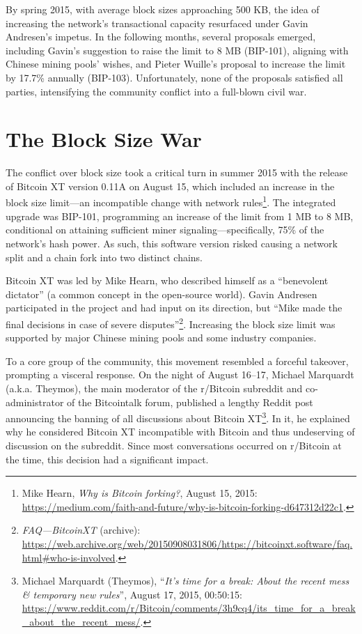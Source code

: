 \documentclass[
  a5paper,
  smalldemyvopaper,10pt,twoside,onecolumn,openright,extrafontsizes,hidelinks]{memoir}
\begin{document}
By spring 2015, with average block sizes approaching 500 KB, the idea of
increasing the network's transactional capacity resurfaced under Gavin
Andresen's impetus. In the following months, several proposals emerged,
including Gavin's suggestion to raise the limit to 8 MB (BIP-101),
aligning with Chinese mining pools' wishes, and Pieter Wuille's proposal
to increase the limit by 17.7\% annually (BIP-103). Unfortunately, none
of the proposals satisfied all parties, intensifying the community
conflict into a full-blown civil war.

\section*{The Block Size War}\label{la-guerre-des-blocs}


The conflict over block size took a critical turn in summer 2015 with
the release of Bitcoin XT version 0.11A on August 15, which included an
increase in the block size limit---an incompatible change with network
rules\footnote{Mike Hearn, \emph{Why is Bitcoin forking?}, August 15,
  2015:
  \url{https://medium.com/faith-and-future/why-is-bitcoin-forking-d647312d22c1}.}.
The integrated upgrade was BIP-101, programming an increase of the limit
from 1 MB to 8 MB, conditional on attaining sufficient miner
signaling---specifically, 75\% of the network's hash power. As such,
this software version risked causing a network split and a chain fork
into two distinct chains.

Bitcoin XT was led by Mike Hearn, who described himself as a
``benevolent dictator'' (a common concept in the open-source world).
Gavin Andresen participated in the project and had input on its
direction, but ``Mike made the final decisions in case of severe
disputes''\footnote{\emph{FAQ---BitcoinXT} (archive):
  \url{https://web.archive.org/web/20150908031806/https://bitcoinxt.software/faq.html\#who-is-involved}.}.
Increasing the block size limit was supported by major Chinese mining
pools and some industry companies.

To a core group of the community, this movement resembled a forceful
takeover, prompting a visceral response. On the night of August 16--17,
Michael Marquardt (a.k.a. Theymos), the main moderator of the r/Bitcoin
subreddit and co-administrator of the Bitcointalk forum, published a
lengthy Reddit post announcing the banning of all discussions about
Bitcoin XT\footnote{Michael Marquardt (Theymos), ``\emph{It's time for a
  break: About the recent mess \& temporary new rules}'', August 17,
  2015, 00:50:15:
  \url{https://www.reddit.com/r/Bitcoin/comments/3h9cq4/its_time_for_a_break_about_the_recent_mess/}.}.
In it, he explained why he considered Bitcoin XT incompatible with
Bitcoin and thus undeserving of discussion on the subreddit. Since most
conversations occurred on r/Bitcoin at the time, this decision had a
significant impact.
\end{document}
